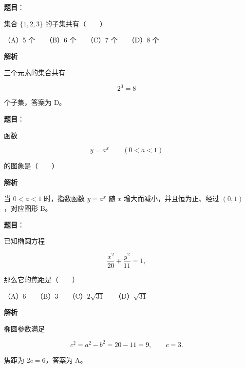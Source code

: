 \begin{answer}

\textbf{题目}：

集合 $\{1,2,3\}$ 的子集共有\mbox{（　　）}

（A）5 个　　（B）6 个　　（C）7 个　　（D）8 个

\textbf{解析}

三个元素的集合共有

\nopagebreak[4]
\[
2^3=8
\]

个子集，答案为 D。


\end{answer}
\begin{answer}

\textbf{题目}：

函数

\nopagebreak[4]
\[
y=a^x\qquad(0<a<1)
\]

的图象是\mbox{（　　）}
\nopagebreak[4]
\begin{center}\end{center}
\nopagebreak[4]
\textbf{解析}

当 $0<a<1$ 时，指数函数 $y=a^x$ 随 $x$ 增大而减小，并且恒为正、经过 $(0,1)$，对应图形 B。


\end{answer}
\begin{answer}

\textbf{题目}：

已知椭圆方程

\nopagebreak[4]
\[
\frac{x^2}{20}+\frac{y^2}{11}=1,
\]

那么它的焦距是\mbox{（　　）}

（A）$6$　　（B）$3$　　（C）$2\sqrt{31}$　　（D）$\sqrt{31}$

\textbf{解析}

椭圆参数满足

\nopagebreak[4]
\[
c^2=a^2-b^2=20-11=9,
\qquad c=3.
\]

焦距为 $2c=6$，答案为 A。


\end{answer}
